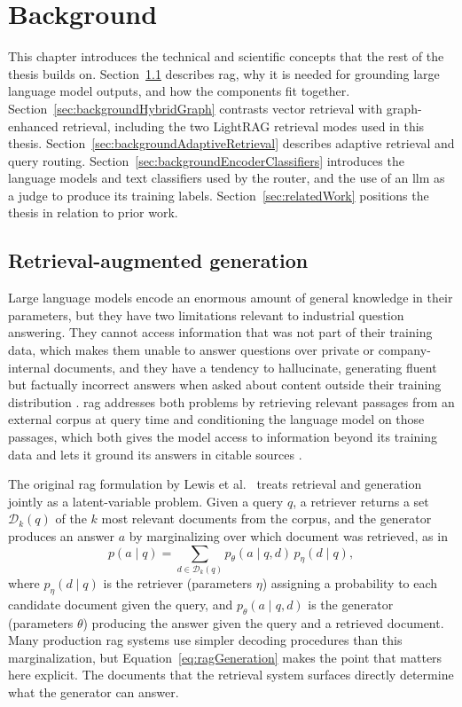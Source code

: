 \documentclass[english, bibtex]{kththesis}               %
\numberwithin{listing}{chapter}
\begin{document}
\cleardoublepage
\chapter{Background}
\label{ch:background}

This chapter introduces the technical and scientific concepts that the rest of the thesis builds on. Section~\ref{sec:backgroundRag} describes \gls{rag}, why it is needed for grounding large language model outputs, and how the components fit together. Section~\ref{sec:backgroundHybridGraph} contrasts vector retrieval with graph-enhanced retrieval, including the two LightRAG retrieval modes used in this thesis. Section~\ref{sec:backgroundAdaptiveRetrieval} describes adaptive retrieval and query routing. Section~\ref{sec:backgroundEncoderClassifiers} introduces the language models and text classifiers used by the router, and the use of an \gls{llm} as a judge to produce its training labels. Section~\ref{sec:relatedWork} positions the thesis in relation to prior work.

\section{Retrieval-augmented generation}
\label{sec:backgroundRag}

Large language models encode an enormous amount of general knowledge in their parameters, but they have two limitations relevant to industrial question answering. They cannot access information that was not part of their training data, which makes them unable to answer questions over private or company-internal documents, and they have a tendency to hallucinate, generating fluent but factually incorrect answers when asked about content outside their training distribution \cite{gao2023ragsurvey}. \Gls{rag} addresses both problems by retrieving relevant passages from an external corpus at query time and conditioning the language model on those passages, which both gives the model access to information beyond its training data and lets it ground its answers in citable sources \cite{gao2023ragsurvey,lewis2020rag}.

The original \gls{rag} formulation by Lewis et al.\ \cite{lewis2020rag} treats retrieval and generation jointly as a latent-variable problem. Given a query \(q\), a retriever returns a set \(\mathcal{D}_k(q)\) of the \(k\) most relevant documents from the corpus, and the generator produces an answer \(a\) by marginalizing over which document was retrieved, as in
\begin{equation}
\label{eq:ragGeneration}
p(a \mid q) =
\sum_{d \in \mathcal{D}_k(q)}
p_\theta(a \mid q,d)\,p_\eta(d \mid q),
\end{equation}
where \(p_\eta(d \mid q)\) is the retriever (parameters \(\eta\)) assigning a probability to each candidate document given the query, and \(p_\theta(a \mid q, d)\) is the generator (parameters \(\theta\)) producing the answer given the query and a retrieved document. Many production \gls{rag} systems use simpler decoding procedures than this marginalization, but Equation~\ref{eq:ragGeneration} makes the point that matters here explicit. The documents that the retrieval system surfaces directly determine what the generator can answer.
\end{document}
